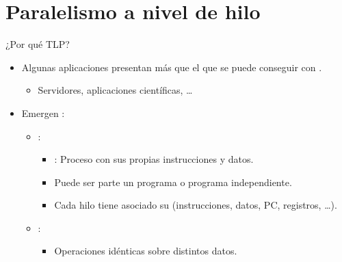 \section{Paralelismo a nivel de hilo}

\begin{frame}[t]{¿Por qué TLP?}
\begin{itemize}
  \item Algunas aplicaciones presentan más  que 
        el que se puede conseguir con .
    \begin{itemize}
      \item Servidores, aplicaciones científicas, \ldots
    \end{itemize}

  \item Emergen :
    \begin{itemize}
      \item {}:
        \begin{itemize}
          \item {}: Proceso con sus propias instrucciones y datos.
          \item Puede ser parte un programa o programa independiente.
          \item Cada hilo tiene asociado su  
                (instrucciones, datos, PC, registros, \ldots).
        \end{itemize}
      \item {}:
        \begin{itemize}
          \item Operaciones idénticas sobre distintos datos.
        \end{itemize}
    \end{itemize}
\end{itemize}
\end{frame}

